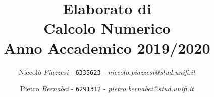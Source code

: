 \documentclass[a4paper]{article}
\date{}
\begin{document}
\title{\vspace{2cm}Elaborato di\\ \textbf{Calcolo Numerico}\\ Anno Accademico 2019/2020\vspace{3cm}}

\author{Niccolò \emph{Piazzesi} - \texttt{6335623} - \textit{niccolo.piazzesi@stud.unifi.it}
   \and Pietro \emph{Bernabei} - \texttt{6291312} - \textit{pietro.bernabei@stud.unifi.it}}


\maketitle
\newpage
\tableofcontents
\newpage
\listoffigures
\listoftables


\newpage







\newpage
{}
\end{document}
